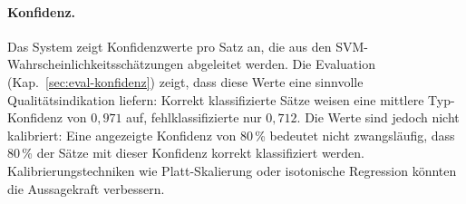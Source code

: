 \paragraph{Konfidenz.}
Das System zeigt Konfidenzwerte pro Satz an, die aus den SVM-Wahrscheinlichkeitsschätzungen abgeleitet werden.
Die Evaluation (Kap.~\ref{sec:eval-konfidenz}) zeigt, dass diese Werte eine sinnvolle Qualitätsindikation liefern: Korrekt klassifizierte Sätze weisen eine mittlere Typ-Konfidenz von $0{,}971$ auf, fehlklassifizierte nur $0{,}712$.
Die Werte sind jedoch nicht kalibriert: Eine angezeigte Konfidenz von 80\,\% bedeutet nicht zwangsläufig, dass 80\,\% der Sätze mit dieser Konfidenz korrekt klassifiziert werden.
Kalibrierungstechniken wie Platt-Skalierung oder isotonische Regression könnten die Aussagekraft verbessern.

